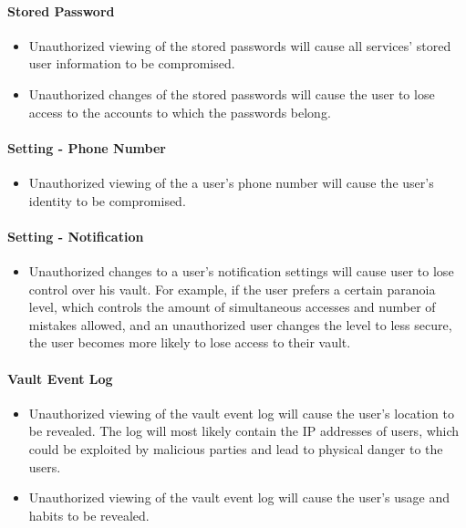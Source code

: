 \documentclass{article}
\begin{document}
\paragraph{Stored Password}
\label{par:stored_password}
\begin{itemize}
  \item Unauthorized viewing of the stored passwords will cause all services’ stored user information to be compromised.
  \item Unauthorized changes of the stored passwords will cause the user to lose access to the accounts to which the passwords belong.
\end{itemize}

\paragraph{Setting - Phone Number}
\label{par:setting_phone_number}
\begin{itemize}
  \item Unauthorized viewing of the a user’s phone number will cause the user’s identity to be compromised.
\end{itemize}

\paragraph{Setting - Notification}
\label{par:setting_notification}
\begin{itemize}
  \item Unauthorized changes to a user’s notification settings will cause user to lose control over his vault. For example, if the user prefers a certain paranoia level, which controls the amount of simultaneous accesses and number of mistakes allowed, and an unauthorized user changes the level to less secure, the user becomes more likely to lose access to their vault.
\end{itemize}

\paragraph{Vault Event Log}
\label{par:vault_event_log}
\begin{itemize}
  \item Unauthorized viewing of the vault event log will cause the user’s location to be revealed. The log will most likely contain the IP addresses of users, which could be exploited by malicious parties and lead to physical danger to the users.
  \item Unauthorized viewing of the vault event log will cause the user’s usage and habits to be revealed.
\end{itemize}
\end{document}
